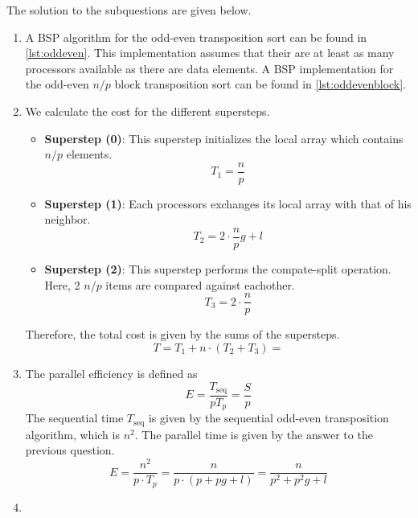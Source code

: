 \documentclass[../main.tex]{subfiles}
\begin{document}
\begin{solution} The solution to the subquestions are given below.
\begin{enumerate}
	\item A BSP algorithm for the odd-even transposition sort can be found in \autoref{lst:oddeven}. This implementation assumes that their are at least as many processors available as there are data elements. A BSP implementation for the odd-even $n/p$ block transposition sort can be found in \autoref{lst:oddevenblock}.
		
		
	\item We calculate the cost for the different supersteps.
	\begin{itemize}
		\item \textbf{Superstep (0)}: This superstep initializes the local array which contains $n/p$ elements.
		\begin{equation}
			T_1 = \frac{n}{p}
		\end{equation}
		\item \textbf{Superstep (1)}: Each processors exchanges its local array with that of his neighbor.
		\begin{equation}
			T_2 = 2 \cdot \frac{n}{p} g + l
		\end{equation}
		\item \textbf{Superstep (2)}: This superstep performs the compate-split operation. Here, 2 $n/p$ items are compared against eachother.
		\begin{equation}
			T_3 = 2 \cdot \frac{n}{p}
		\end{equation}
	\end{itemize}
	Therefore, the total cost is given by the sums of the supersteps.
	\begin{equation}
		T = T_1 + n \cdot (T_2 + T_3) =
	\end{equation}
	\item The parallel efficiency is defined as
	\begin{equation}
		E = \frac{T_\text{seq}}{p T_p} = \frac{S}{p}
	\end{equation}
	The sequential time $T_\text{seq}$ is given by the sequential odd-even transposition algorithm, which is $n^2$. The parallel time is given by the answer to the previous question.
	\begin{equation}
		E = \frac{n^2}{p \cdot T_p} = \frac{n}{p \cdot (p + pg + l)} = \frac{n}{p^2 + p^2g + l}
	\end{equation}
	\item
\end{enumerate}
\end{solution}
\end{document}
